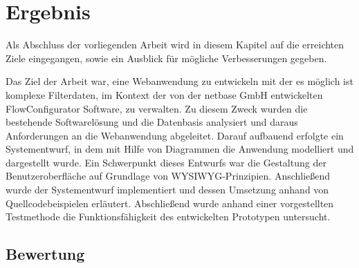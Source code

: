 \chapter{Ergebnis}
\label{cha:Ergebnis}
Als Abschluss der vorliegenden Arbeit wird in diesem Kapitel auf die erreichten Ziele eingegangen, sowie ein Ausblick für mögliche Verbesserungen gegeben.

Das Ziel der Arbeit war, eine Webanwendung zu entwickeln mit der es möglich ist komplexe Filterdaten, im Kontext der von der netbase GmbH entwickelten FlowConfigurator Software, zu verwalten. Zu diesem Zweck wurden die bestehende Softwarelösung und die Datenbasis analysiert und daraus Anforderungen an die Webanwendung abgeleitet. Darauf aufbauend erfolgte ein Systementwurf, in dem mit Hilfe von Diagrammen die Anwendung modelliert und dargestellt wurde. Ein Schwerpunkt dieses Entwurfs war die Gestaltung der Benutzeroberfläche auf Grundlage von WYSIWYG-Prinzipien. Anschließend wurde der Systementwurf implementiert und dessen Umsetzung anhand von Quellcodebeispielen erläutert. Abschließend wurde anhand einer vorgestellten Testmethode die Funktionsfähigkeit des entwickelten Prototypen untersucht.

\section{Bewertung}

